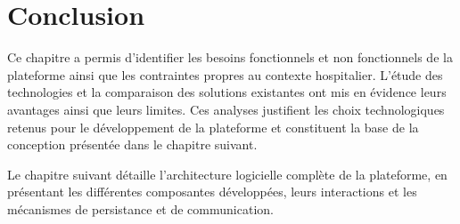 \section{Conclusion}

Ce chapitre a permis d'identifier les besoins fonctionnels et non fonctionnels de la plateforme ainsi que les contraintes propres au contexte hospitalier. L'étude des technologies et la comparaison des solutions existantes ont mis en évidence leurs avantages ainsi que leurs limites. Ces analyses justifient les choix technologiques retenus pour le développement de la plateforme et constituent la base de la conception présentée dans le chapitre suivant.

Le chapitre suivant détaille l'architecture logicielle complète de la plateforme, en présentant les différentes composantes développées, leurs interactions et les mécanismes de persistance et de communication.